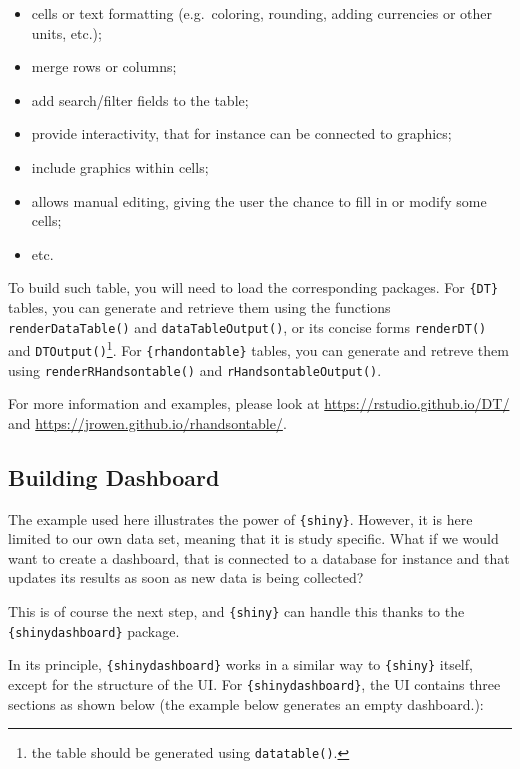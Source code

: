 \documentclass[
]{book}
\providecommand{\tightlist}{%
  \setlength{\itemsep}{0pt}\setlength{\parskip}{0pt}}
\begin{document}
\begin{itemize}
\tightlist
\item
  cells or text formatting (e.g.~coloring, rounding, adding currencies or other units, etc.);
\item
  merge rows or columns;
\item
  add search/filter fields to the table;
\item
  provide interactivity, that for instance can be connected to graphics;
\item
  include graphics within cells;
\item
  allows manual editing, giving the user the chance to fill in or modify some cells;
\item
  etc.
\end{itemize}

To build such table, you will need to load the corresponding packages. For \texttt{\{DT\}} tables, you can generate and retrieve them using the functions \texttt{renderDataTable()} and \texttt{dataTableOutput()}, or its concise forms \texttt{renderDT()} and \texttt{DTOutput()}\footnote{the table should be generated using \texttt{datatable()}.}. For \texttt{\{rhandontable\}} tables, you can generate and retreve them using \texttt{renderRHandsontable()} and \texttt{rHandsontableOutput()}.

For more information and examples, please look at \url{https://rstudio.github.io/DT/} and \url{https://jrowen.github.io/rhandsontable/}.

\hypertarget{building-dashboard}{%
\subsection{Building Dashboard}\label{building-dashboard}}

The example used here illustrates the power of \texttt{\{shiny\}}. However, it is here limited to our own data set, meaning that it is study specific. What if we would want to create a dashboard, that is connected to a database for instance and that updates its results as soon as new data is being collected?

This is of course the next step, and \texttt{\{shiny\}} can handle this thanks to the \texttt{\{shinydashboard\}} package.

In its principle, \texttt{\{shinydashboard\}} works in a similar way to \texttt{\{shiny\}} itself, except for the structure of the UI. For \texttt{\{shinydashboard\}}, the UI contains three sections as shown below (the example below generates an empty dashboard.):
\end{document}

